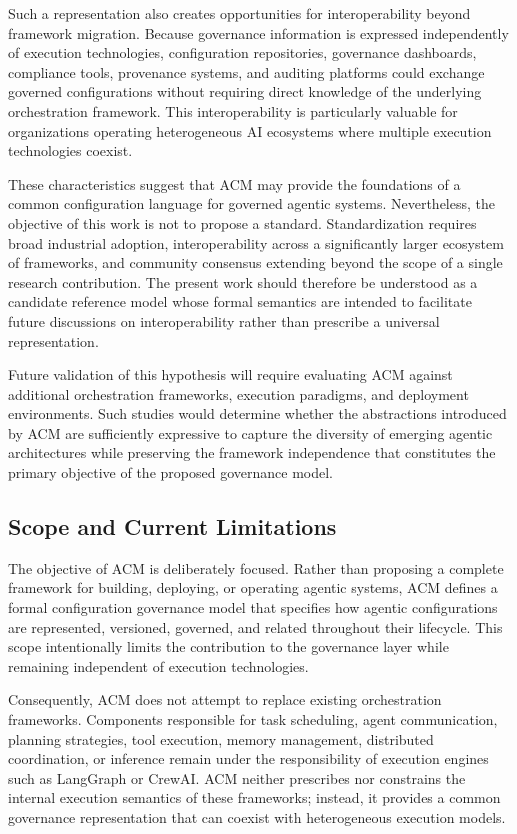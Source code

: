 \documentclass[10pt]{article}
\begin{document}
Such a representation also creates opportunities for interoperability beyond framework migration. Because governance information is expressed independently of execution technologies, configuration repositories, governance dashboards, compliance tools, provenance systems, and auditing platforms could exchange governed configurations without requiring direct knowledge of the underlying orchestration framework. This interoperability is particularly valuable for organizations operating heterogeneous AI ecosystems where multiple execution technologies coexist.

These characteristics suggest that ACM may provide the foundations of a common configuration language for governed agentic systems. Nevertheless, the objective of this work is not to propose a standard. Standardization requires broad industrial adoption, interoperability across a significantly larger ecosystem of frameworks, and community consensus extending beyond the scope of a single research contribution. The present work should therefore be understood as a candidate reference model whose formal semantics are intended to facilitate future discussions on interoperability rather than prescribe a universal representation.

Future validation of this hypothesis will require evaluating ACM against additional orchestration frameworks, execution paradigms, and deployment environments. Such studies would determine whether the abstractions introduced by ACM are sufficiently expressive to capture the diversity of emerging agentic architectures while preserving the framework independence that constitutes the primary objective of the proposed governance model.

\subsection{Scope and Current Limitations}

The objective of ACM is deliberately focused. Rather than proposing a complete framework for building, deploying, or operating agentic systems, ACM defines a formal configuration governance model that specifies how agentic configurations are represented, versioned, governed, and related throughout their lifecycle. This scope intentionally limits the contribution to the governance layer while remaining independent of execution technologies.

Consequently, ACM does not attempt to replace existing orchestration frameworks. Components responsible for task scheduling, agent communication, planning strategies, tool execution, memory management, distributed coordination, or inference remain under the responsibility of execution engines such as LangGraph or CrewAI. ACM neither prescribes nor constrains the internal execution semantics of these frameworks; instead, it provides a common governance representation that can coexist with heterogeneous execution models.
\end{document}
